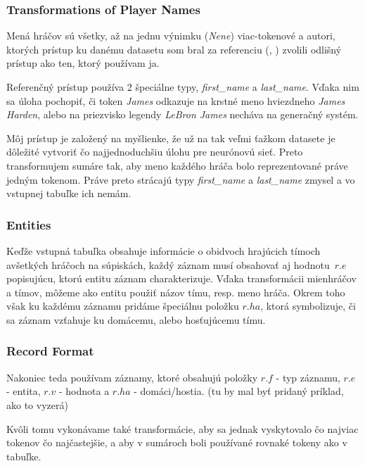 \subsubsection{Transformations of Player Names} \label{trans_p_nms}

Mená hráčov sú všetky, až na jednu výnimku (\emph{Nene}) viac-tokenové a autori, ktorých prístup ku danému datasetu som bral za referenciu (\citep{wiseman2017}, \citep{puduppully2019datatotext}) zvolili odlišný prístup ako ten, ktorý používam ja.

Referenčný prístup používa 2 špeciálne typy, \emph{first\_name} a \emph{last\_name}. Vďaka nim sa úloha pochopiť, či token \emph{James} odkazuje na krstné meno hviezdneho \emph{James Harden}, alebo na priezvisko legendy \emph{LeBron James} necháva na generačný systém.

Môj prístup je založený na myšlienke, že už na tak veľmi ťažkom datasete je dôležité vytvoriť čo najjednoduchšiu úlohu pre neurónovú sieť. Preto transformujem sumáre tak, aby meno každého hráča bolo reprezentované práve jedným tokenom. Práve preto strácajú typy \emph{first\_name} a \emph{last\_name} zmysel a vo vstupnej tabuľke ich nemám.

\subsubsection{Entities}

Keďže vstupná tabuľka obsahuje informácie o obidvoch hrajúcich tímoch a\linebreak[4]všetkých hráčoch na súpiskách, každý záznam musí obsahovať aj hodnotu~$r.e$ popisujúcu, ktorú entitu záznam charakterizuje. Vďaka transformácii mien\linebreak[4]hráčov a tímov, môžeme ako entitu použiť názov tímu, resp. meno hráča. Okrem toho však ku každému záznamu pridáme špeciálnu položku $r.ha$, ktorá symbolizuje, či sa záznam vzťahuje ku domácemu, alebo hosťujúcemu tímu. 

\subsubsection{Record Format}

Nakoniec teda používam záznamy, ktoré obsahujú položky $r.f$ - typ záznamu, $r.e$ - entita, $r.v$ - hodnota a $r.ha$ - domáci/hostia. (tu by mal byť pridaný príklad, ako to vyzerá)

Kvôli tomu vykonávame také transformácie, aby sa jednak vyskytovalo čo najviac tokenov čo najčastejšie, a aby v sumároch boli používané rovnaké tokeny ako v tabuľke.

